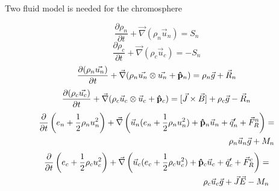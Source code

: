 \documentclass{beamer}
\begin{document}
\begin{frame}{Two fluid model is needed for the chromosphere}

\begin{equation} \nonumber
\frac{\partial \rho_n}{\partial t} + \vec{\nabla} (\rho_n\vec{u}_n) = S_n
\end{equation}
%
\begin{equation} \nonumber
\frac{\partial \rho_c}{\partial t} + \vec{\nabla} (\rho_c\vec{u}_c) = -S_n
\end{equation}
%
\begin{equation}\nonumber
\frac{\partial (\rho_n\vec{u_n})}{\partial t} + \vec{\nabla}(\rho_n\vec{u_n} \otimes \vec{u_n}+{\bf\hat{p}}_n)= \rho_n\vec{g} +\vec{R}_n
\end{equation}
%
\begin{equation} \nonumber
\frac{\partial (\rho_c\vec{u_c})}{\partial t} + \vec{\nabla}(\rho_c\vec{u}_c\otimes\vec{u}_c+{\bf\hat{p}}_{c})=[\vec{J}\times\vec{B}] + \rho_c\vec{g}  -\vec{R}_n
\end{equation}
%
\begin{eqnarray} \nonumber
\frac{\partial}{\partial t} \left( e_n+\frac{1}{2}\rho_n u_n^2 \right) +  \vec{\nabla}\left( \vec{u}_n (e_n + \frac{1}{2}\rho_n u_n^2) + {\bf\hat{p}}_n\vec{u}_n + \vec{q}_{n}^{\prime} + \vec{F}_R^n \right)  = \\ \nonumber
%
\rho_n\vec{u}_n\vec{g}  + M_n
\end{eqnarray}
%
\begin{eqnarray} \nonumber
\frac{\partial}{\partial t} \left(  e_c+\frac{1}{2}\rho_c u_c^2 \right) +  \vec{\nabla}\left( \vec{u}_c (e_c + \frac{1}{2}\rho_c u_c^2) + {\bf\hat{p}}_c\vec{u}_c + \vec{q}_{c}^{\prime} + \vec{F}_R^c \right)  = \\ \nonumber
%
\rho_c\vec{u}_c\vec{g} + \vec{J}\vec{E} -M_n
\end{eqnarray}

\end{frame}
\end{document}
